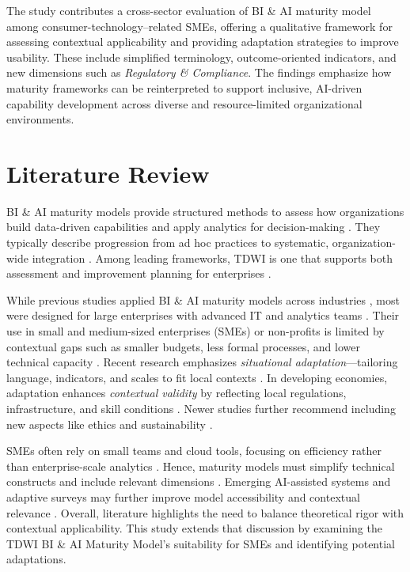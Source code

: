 \documentclass[conference]{IEEEtran}
\begin{document}
The study contributes a cross-sector evaluation of BI \& AI maturity model among consumer-technology–related SMEs, offering a qualitative framework for assessing contextual applicability and providing adaptation strategies to improve usability. These include simplified terminology, outcome-oriented indicators, and new dimensions such as \textit{Regulatory \& Compliance}. The findings emphasize how maturity frameworks can be reinterpreted to support inclusive, AI-driven capability development across diverse and resource-limited organizational environments.



\section{Literature Review}
\label{sec:literature_review}

BI \& AI maturity models provide structured methods to assess how organizations build data-driven capabilities and apply analytics for decision-making \cite{halper2025tdwi, popovic2012towards}.  
They typically describe progression from ad hoc practices to systematic, organization-wide integration \cite{chen2012business, davenport2007competing}.  
Among leading frameworks, TDWI is one that supports both assessment and improvement planning for enterprises \cite{halper2025tdwi}.  

While previous studies applied BI \& AI maturity models across industries \cite{al-sai2023bigdata,sadiq2021aimaturity}, most were designed for large enterprises with advanced IT and analytics teams \cite{llave2019review}.  
Their use in small and medium-sized enterprises (SMEs) or non-profits is limited by contextual gaps such as smaller budgets, less formal processes, and lower technical capacity \cite{schuster2021maturity, holtzblatt2015contextual}.  
Recent research emphasizes \textit{situational adaptation}---tailoring language, indicators, and scales to fit local contexts \cite{becker2009developing, schuster2021maturity}.  
In developing economies, adaptation enhances \textit{contextual validity} by reflecting local regulations, infrastructure, and skill conditions \cite{adekunle2022critical,vandyk2012telemedicine}.  
Newer studies further recommend including new aspects like ethics and sustainability \cite{Krijger2023AIEthicsMaturity, Vasquez2021Sustainability}.  

SMEs often rely on small teams and cloud tools, focusing on efficiency rather than enterprise-scale analytics \cite{kedi2024sme_ml_marketing,jain2024cloudadoption}.  
Hence, maturity models must simplify technical constructs and include relevant dimensions \cite{adekunle2022critical}.  
Emerging AI-assisted systems and adaptive surveys may further improve model accessibility and contextual relevance \cite{minn2022ai_assisted_assessment}.  
Overall, literature highlights the need to balance theoretical rigor with contextual applicability.  
This study extends that discussion by examining the TDWI BI \& AI Maturity Model’s suitability for SMEs and identifying potential adaptations.
\end{document}
